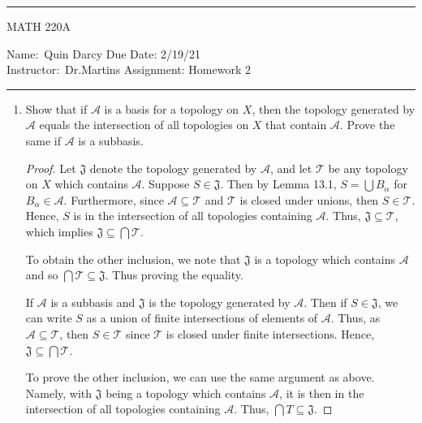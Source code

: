 \documentclass[12pt]{article}
\theoremstyle{definition}
\begin{document}
    \thispagestyle{empty}\hrule

    \begin{center}
        \vspace{.4cm} { \large MATH 220A}
    \end{center}
    {Name:\ Quin Darcy \hspace{\fill} Due Date: 2/19/21  \\
    { Instructor:}\ Dr.Martins \hspace{\fill} Assignment:
    Homework 2 \\ \hrule}

    \begin{enumerate}
        \item Show that if $\mathcal{A}$ is a basis for a topology on $X$, then
            the topology generated by $\mathcal{A}$ equals the intersection of
            all topologies on $X$ that contain $\mathcal{A}$. Prove the same if
            $\mathcal{A}$ is a subbasis.
                \begin{proof}
                    Let $\mathfrak{J}$ denote the topology generated by $\mathcal{A}$, and let $\mathcal{T}$ be any topology on $X$
                    which contains $\mathcal{A}$. Suppose $S\in\mathfrak{J}$. Then by Lemma 13.1, $S=\bigcup B_{\alpha}$ for $B_{\alpha}\in\mathcal{A}$. Furthermore, since $\mathcal{A}\subseteq\mathcal{T}$ and $\mathcal{T}$ is closed under unions, then $S\in\mathcal{T}$. Hence, $S$ is in the intersection of all topologies containing $\mathcal{A}$. Thus, $\mathfrak{J}\subseteq\mathcal{T}$, which implies $\mathfrak{J}\subseteq\bigcap\mathcal{T}$. \par\hspace{4mm} To obtain the other inclusion, we note that $\mathfrak{J}$ is a topology which contains $\mathcal{A}$ and so $\bigcap\mathcal{T}\subseteq\mathfrak{J}$. Thus proving the equality.\par\hspace{4mm} If $\mathcal{A}$ is a subbasis and $\mathfrak{J}$ is the topology generated by $\mathcal{A}$. Then if $S\in\mathfrak{J}$, we can write $S$ as a union of finite intersections of elements of $\mathcal{A}$. Thus, as $\mathcal{A}\subseteq\mathcal{T}$, then $S\in\mathcal{T}$ since $\mathcal{T}$ is closed under finite intersections. Hence, $\mathfrak{J}\subseteq\bigcap\mathcal{T}$. \par\hspace{4mm} To prove the other inclusion, we can use the same argument as above. Namely, with $\mathfrak{J}$ being a topology which contains $\mathcal{A}$, it is then in the intersection of all topologies containing $\mathcal{A}$. Thus, $\bigcap{T}\subseteq\mathfrak{J}$.

\end{proof}
\end{enumerate}
\end{document}
